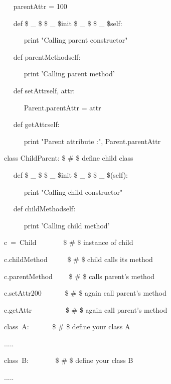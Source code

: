 \begin{12pt}
\begin{12pt}
\begin{12pt}
\begin{12pt}
\begin{12pt}
\begin{12pt}
\begin{12pt}
\begin{12pt}
\begin{12pt}
\begin{12pt}
\begin{12pt}
\begin{12pt}
\begin{12pt}
\begin{12pt}
\begin{12pt}
\begin{12pt}
\begin{12pt}
\begin{12pt}
\begin{12pt}
\begin{12pt}
\noindent 
~~ parentAttr = 100 \par
\noindent 
~~ def  \$  \_  \$ \$  \_  \$init \$  \_  \$ \$  \_  \${self}: \par
\noindent 
~~~~~ print "Calling parent constructor" \par
\vspace{12pt}
\noindent 
~~ def parentMethod{self}: \par
\noindent 
~~~~~ print 'Calling parent method' \par
\begin{12pt}
\noindent 
~~ def setAttr{self, attr}: \par
\noindent 
~~~~~ Parent.parentAttr = attr \par
\begin{12pt}
\noindent 
~~ def getAttr{self}: \par
\noindent 
~~~~~ print "Parent attribute :", Parent.parentAttr \par
\vspace{12pt}
\noindent 
class Child{Parent}:  \$  \#  \$ define child class \par
\noindent 
~~ def  \$  \_  \$ \$  \_  \$init \$  \_  \$ \$  \_  \$(self): \par
\noindent 
~~~~~ print "Calling child constructor" \par
\vspace{12pt}
\noindent 
~~ def childMethod{self}: \par
\noindent 
~~~~~ print 'Calling child method' \par
\vspace{12pt}
\noindent 
c~=~Child{}~~~~~~~    \$  \#  \$ instance of child \par
\noindent 
c.childMethod{}~~~~~  \$  \#  \$ child calls its method \par
\noindent 
c.parentMethod{}~~~~  \$  \#  \$ calls parent's method \par
\noindent 
c.setAttr{200}~~~~~~  \$  \#  \$ again call parent's method \par
\noindent 
c.getAttr{}~~~~~~~~~  \$  \#  \$ again call parent's method \par
class~A:~~~~~~   \$  \#  \$ define your class A \par
\noindent 
..... \par
\vspace{12pt}
\noindent 
class~B:~~~~~~~   \$  \#  \$ define your class B \par
\noindent 
..... \par
\vspace{12pt}

\end{12pt}
\end{12pt}
\end{12pt}
\end{12pt}
\end{12pt}
\end{12pt}
\end{12pt}
\end{12pt}
\end{12pt}
\end{12pt}
\end{12pt}
\end{12pt}
\end{12pt}
\end{12pt}
\end{12pt}
\end{12pt}
\end{12pt}
\end{12pt}
\end{12pt}
\end{12pt}
\end{12pt}
\end{12pt}

